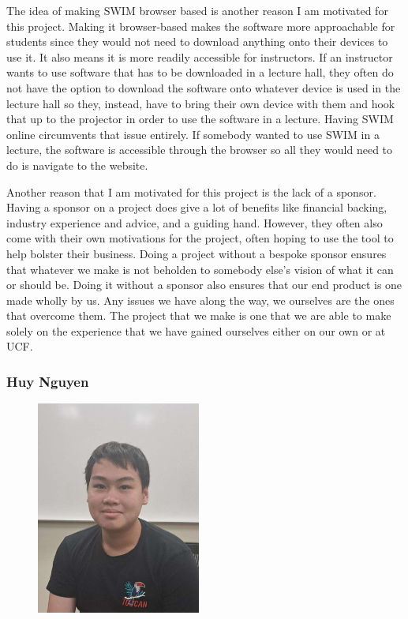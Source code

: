 \documentclass[
    paper=letter,
    parskip=half,
    fontsize=12pt,
    titlepage=firstiscover,
    toc=bibliography,
    numbers=endperiod
]{scrartcl}
\begin{document}
The idea of making SWIM browser based is another reason I am motivated
for this project. Making it browser-based makes the software more
approachable for students since they would not need to download anything
onto their devices to use it. It also means it is more readily
accessible for instructors. If an instructor wants to use software that
has to be downloaded in a lecture hall, they often do not have the
option to download the software onto whatever device is used in the
lecture hall so they, instead, have to bring their own device with them
and hook that up to the projector in order to use the software in a
lecture. Having SWIM online circumvents that issue entirely. If somebody
wanted to use SWIM in a lecture, the software is accessible through the
browser so all they would need to do is navigate to the website.

Another reason that I am motivated for this project is the lack of a
sponsor. Having a sponsor on a project does give a lot of benefits like
financial backing, industry experience and advice, and a guiding hand.
However, they often also come with their own motivations for the
project, often hoping to use the tool to help bolster their business.
Doing a project without a bespoke sponsor ensures that whatever we make
is not beholden to somebody else's vision of what it can or should be.
Doing it without a sponsor also ensures that our end product is one made
wholly by us. Any issues we have along the way, we ourselves are the
ones that overcome them. The project that we make is one that we are
able to make solely on the experience that we have gained ourselves
either on our own or at UCF.

\subsubsection{Huy Nguyen}
\begin{figure}[H]
    \includegraphics[height=7cm]{profile-huy}
\end{figure}
\end{document}
